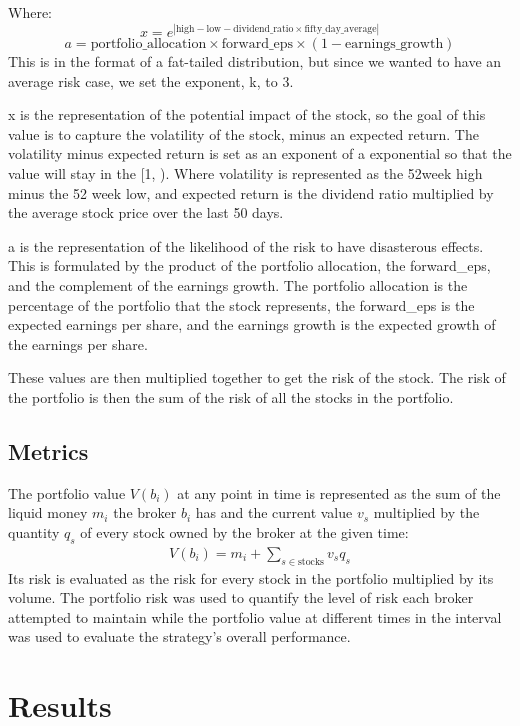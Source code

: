\documentclass[letterpaper, 11 pt, proceedings]{IEEEtran}
\begin{document}
		Where:
		\[
		x = e^{\left| \text{{high}} - \text{{low}} - \text{{dividend\_ratio}} \times \text{{fifty\_day\_average}} \right|}
		\]
		\[
		a = \text{{portfolio\_allocation}} \times \text{{forward\_eps}} \times (1 - \text{{earnings\_growth}})
		\]
		This is in the format of a fat-tailed distribution, but since we wanted to have an average risk case, we set the exponent, k, to 3.

		x is the representation of the potential impact of the stock, so the goal of this value is to capture the volatility of the stock, minus an expected return. The volatility minus expected return is set as an exponent of a exponential so that the value will stay in the [1, \infty).
		Where volatility is represented as the 52week high minus the 52 week low, and expected return is the dividend ratio multiplied by the average stock price over the last 50 days.

		a is the representation of the likelihood of the risk to have disasterous effects. This is formulated by the product of the portfolio allocation, the forward_eps, and the complement of the earnings growth. The portfolio allocation is the percentage of the portfolio that the stock represents, the forward_eps is the expected earnings per share, and the earnings growth is the expected growth of the earnings per share.

		These values are then multiplied together to get the risk of the stock. The risk of the portfolio is then the sum of the risk of all the stocks in the portfolio.
		
	\subsection{Metrics}\label{subsec:metrics}	
	The portfolio value $V(b_i)$ at any point in time is represented as the sum of the liquid money $m_i$ the broker $b_i$ has and the current value $v_s$ multiplied by the quantity $q_s$ of every stock owned by the broker at the given time: 
	\begin{align}
		V(b_i) = m_i + \sum\limits_{s\in\text{stocks}} v_s q_s\label{eq:portfolio_value}
	\end{align}
	Its risk is evaluated as the risk for every stock in the portfolio multiplied by its volume. The portfolio risk was used to quantify the level of risk each broker attempted to maintain while the portfolio value at different times in the interval was used to evaluate the strategy's overall performance.


	\section{Results}\label{sec:results}
		
\end{document}

